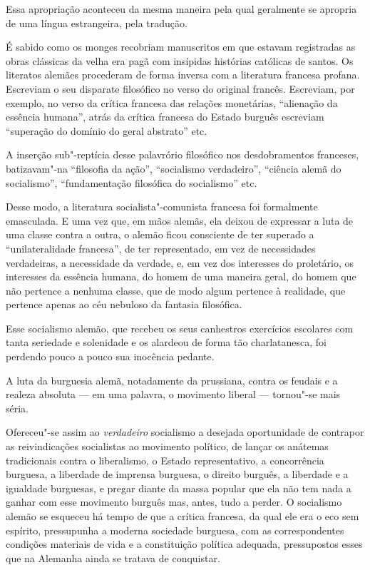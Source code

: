 Essa apropriação aconteceu da mesma maneira pela qual geralmente se
apropria de uma língua estrangeira, pela tradução.

É sabido como os monges recobriam manuscritos em que estavam registradas
as obras clássicas da velha era pagã com insípidas histórias católicas
de santos. Os literatos alemães procederam de forma inversa com a
literatura francesa profana. Escreviam o seu disparate filosófico no
verso do original francês. Escreviam, por exemplo, no verso da crítica
francesa das relações monetárias, ``alienação da essência humana'', atrás
da crítica francesa do Estado burguês escreviam ``superação do domínio
do geral abstrato'' etc.

A inserção sub"-reptícia desse palavrório filosófico nos desdobramentos
franceses, batizavam"-na ``filosofia da ação'', ``socialismo verdadeiro'',
``ciência alemã do socialismo'', ``fundamentação filosófica do socialismo''
etc.

Desse modo, a literatura socialista"-comunista francesa foi formalmente
emasculada. E uma vez que, em mãos alemãs, ela deixou de expressar a
luta de uma classe contra a outra, o alemão ficou consciente de ter
superado a ``unilateralidade francesa'', de ter representado, em vez de
necessidades verdadeiras, a necessidade da verdade, e, em vez dos
interesses do proletário, os interesses da essência humana, do homem de
uma maneira geral, do homem que não pertence a nenhuma classe, que de
modo algum pertence à realidade, que pertence apenas ao céu nebuloso da
fantasia filosófica.

Esse socialismo alemão, que recebeu os seus canhestros exercícios
escolares com tanta seriedade e solenidade e os alardeou de forma tão
charlatanesca, foi perdendo pouco a pouco sua inocência pedante.

A luta da burguesia alemã, notadamente da prussiana, contra os feudais e
a realeza absoluta  ---  em uma palavra, o movimento liberal  ---  tornou"-se
mais séria.

Ofereceu"-se assim ao \textit{verdadeiro} socialismo a desejada oportunidade
de contrapor as reivindicações socialistas ao movimento político, de
lançar os anátemas tradicionais contra o liberalismo, o Estado
representativo, a concorrência burguesa, a liberdade de imprensa
burguesa, o direito burguês, a liberdade e a igualdade burguesas, e pregar
diante da massa popular que ela não tem nada a ganhar com esse
movimento burguês mas, antes, tudo a perder. O socialismo alemão se
esqueceu há tempo de que a crítica francesa, da qual ele era o eco sem
espírito, pressupunha a moderna sociedade burguesa, com as
correspondentes condições materiais de vida e a constituição política
adequada, pressupostos esses que na Alemanha ainda se tratava de
conquistar.

